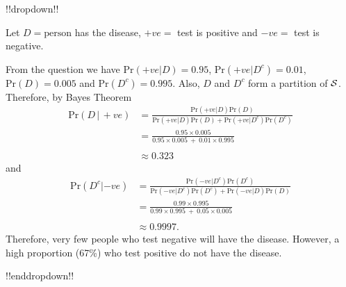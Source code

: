 !!dropdown!!

Let $D=\text{person}$ has the disease, $+ve=$ test is positive and $-ve=$ test is negative.  

    From the question
    we have $\text{Pr}(+ve|D)=0.95$, $\text{Pr}(+ve|D^c)=0.01$, $\text{Pr}(D)=0.005$ and
    $\text{Pr}(D^c)=0.995$.  Also, $D$ and $D^c$ form a partition of ${\cal
    S}$. Therefore, by Bayes Theorem
    \begin{align*}
    \text{Pr}(D\,|\, +ve) &=\frac{\text{Pr}(+ve|D)\text{Pr}(D)}{\text{Pr}(+ve|D)\text{Pr}(D)+\text{Pr}(+ve|D^c)\text{Pr}(D^c)} \\
    &=\frac{0.95\times 0.005}{0.95\times 0.005~+~0.01\times 0.995} \\ \\
    &\approx 0.323
    \end{align*}
    and
    \begin{align*}
    \text{Pr}(D^c|-ve) &=\frac{\text{Pr}(-ve|D^c)\text{Pr}(D^c)}{\text{Pr}(-ve|D^c)\text{Pr}(D^c)+\text{Pr}(-ve|D)\text{Pr}(D)} \\
    &=\frac{0.99\times 0.995}{0.99\times 0.995~+~0.05\times 0.005} \\ \\
    &\approx 0.9997.
    \end{align*}
    Therefore, very few people who test negative will have the
    disease. However, a high proportion (67\%) who test positive do not
    have the disease.

!!enddropdown!!





